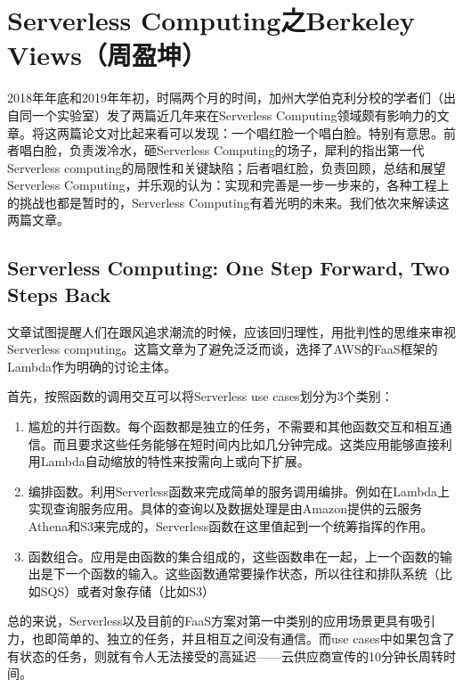 \documentclass[11pt]{article}
\begin{document}
\section{Serverless Computing之Berkeley Views（周盈坤）}\label{sec:berkeley}
2018年年底和2019年年初，时隔两个月的时间，加州大学伯克利分校的学者们（出自同一个实验室）发了两篇近几年来在Serverless Computing领域颇有影响力的文章\cite{hellerstein2018serverless,jonas2019cloud}。将这两篇论文对比起来看可以发现：一个唱红脸一个唱白脸。特别有意思。前者\cite{hellerstein2018serverless}唱白脸，负责泼冷水，砸Serverless Computing的场子，犀利的指出第一代Serverless computing的局限性和关键缺陷；后者\cite{jonas2019cloud}唱红脸，负责回顾，总结和展望Serverless Computing，并乐观的认为：实现和完善是一步一步来的，各种工程上的挑战也都是暂时的，Serverless Computing有着光明的未来。我们依次来解读这两篇文章。

\subsection{Serverless Computing: One Step Forward, Two Steps Back}
文章\cite{hellerstein2018serverless}试图提醒人们在跟风追求潮流的时候，应该回归理性，用批判性的思维来审视Serverless computing。这篇文章为了避免泛泛而谈，选择了AWS的FaaS框架的Lambda作为明确的讨论主体。

首先，按照函数的调用交互可以将Serverless use cases划分为3个类别\cite{hellerstein2018serverless}：
\begin{enumerate}
	\item 尴尬的并行函数。每个函数都是独立的任务，不需要和其他函数交互和相互通信。而且要求这些任务能够在短时间内比如几分钟完成。这类应用能够直接利用Lambda自动缩放的特性来按需向上或向下扩展。
	\item 编排函数。利用Serverless函数来完成简单的服务调用编排。例如在Lambda上实现查询服务应用。具体的查询以及数据处理是由Amazon提供的云服务Athena和S3来完成的，Serverless函数在这里值起到一个统筹指挥的作用。
	\item 函数组合。应用是由函数的集合组成的，这些函数串在一起，上一个函数的输出是下一个函数的输入。这些函数通常要操作状态，所以往往和排队系统（比如SQS）或者对象存储（比如S3）
\end{enumerate}
总的来说，Serverless以及目前的FaaS方案对第一中类别的应用场景更具有吸引力，也即简单的、独立的任务，并且相互之间没有通信。而use cases中如果包含了有状态的任务，则就有令人无法接受的高延迟——云供应商宣传的10分钟长周转时间。
\end{document}
